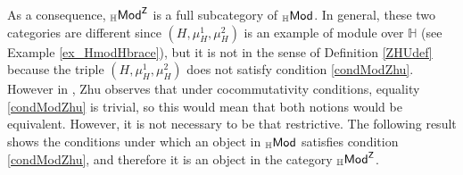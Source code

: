 \documentclass[11pt,reqno]{amsart}
\theoremstyle{plain}%
\theoremstyle{definition}
\theoremstyle{remark}
\begin{document}
As a consequence, ${}_{\mathbb{H}}{\sf Mod}^{{\sf Z}}$ is a full subcategory of ${}_{\mathbb{H}}{\sf Mod}$. In general, these two categories are different since $(H,\mu_{H}^{1},\mu_{H}^{2})$ is an example of module over $\mathbb{H}$ (see Example \ref{ex_HmodHbrace}), but it is not in the sense of Definition \ref{ZHUdef} because the triple $(H,\mu_{H}^{1},\mu_{H}^{2})$ does not satisfy condition \eqref{condModZhu}.  However in \cite[Remark 3.3]{ZHU}, Zhu observes that under cocommutativity conditions, equality \eqref{condModZhu} is trivial, so this would mean that both notions would be equivalent. However, it is not necessary to be that restrictive. The following result shows the conditions under which an object in ${}_{\mathbb{H}}{\sf Mod}$ satisfies condition \eqref{condModZhu}, and therefore it is an object in the category ${}_{\mathbb{H}}{\sf Mod}^{{\sf Z}}$. 
\end{document}
